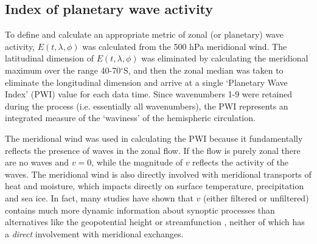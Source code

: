\subsection{Index of planetary wave activity}

To define and calculate an appropriate metric of zonal (or planetary) wave activity, $E(t,\lambda,\phi)$ was calculated from the 500 hPa meridional wind. The latitudinal dimension of $E(t,\lambda,\phi)$ was eliminated by calculating the meridional maximum over the range 40-70$^{\circ}$S, and then the zonal median was taken to eliminate the longitudinal dimension and arrive at a single `Planetary Wave Index' (PWI) value for each data time. Since wavenumbers 1-9 were retained during the process (i.e. essentially all wavenumbers), the PWI represents an integrated measure of the `waviness' of the hemispheric circulation.

The meridional wind was used in calculating the PWI because it fundamentally reflects the presence of waves in the zonal flow. If the flow is purely zonal there are no waves and $v = 0$, while the magnitude of $v$ reflects the activity of the waves. The meridional wind is also directly involved with meridional transports of heat and moisture, which impacts directly on surface temperature, precipitation and sea ice. In fact, many studies have shown that $v$ (either filtered or unfiltered) contains much more dynamic information about synoptic processes than alternatives like the geopotential height or streamfunction \citep[e.g.][]{Berbery1996,Hoskins2005,Petoukhov2013}, neither of which has a \textit{direct} involvement with meridional exchanges. 

